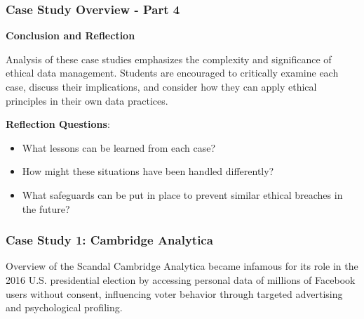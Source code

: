 \documentclass[aspectratio=169]{beamer}
\begin{document}
\begin{frame}[fragile]
    \frametitle{Case Study Overview - Part 4}
    \textbf{Conclusion and Reflection}

    Analysis of these case studies emphasizes the complexity and significance of ethical data management. Students are encouraged to critically examine each case, discuss their implications, and consider how they can apply ethical principles in their own data practices.

    \textbf{Reflection Questions}:
    \begin{itemize}
        \item What lessons can be learned from each case?
        \item How might these situations have been handled differently?
        \item What safeguards can be put in place to prevent similar ethical breaches in the future?
    \end{itemize}
\end{frame}

\begin{frame}[fragile]
    \frametitle{Case Study 1: Cambridge Analytica}
    \begin{block}{Overview of the Scandal}
        Cambridge Analytica became infamous for its role in the 2016 U.S. presidential election by accessing personal data of millions of Facebook users without consent, influencing voter behavior through targeted advertising and psychological profiling.
    \end{block}
\end{frame}
\end{document}
